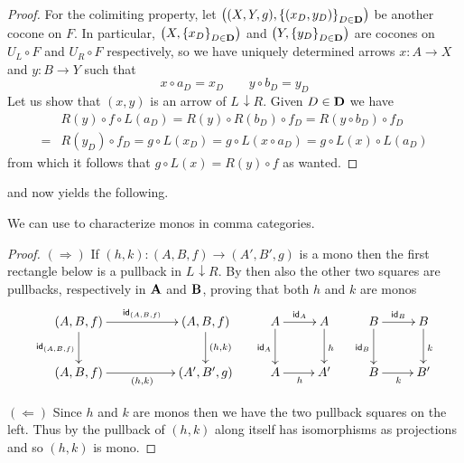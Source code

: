 \documentclass[a4paper,UKenglish,cleveref,pdftex,amsthm,thm-restate,numberwithinsect]{cas-sc}
\theoremstyle{plain}
\newtheorem{corollary}[theorem]{Corollary}
\theoremstyle{definition}
\def\B{\textbf {\textup{B}}}
\def\D{\textbf {\textup{D}}}
\def\A{\textbf {\textup{A}}}
\newcommand{\comm}[2]{#1\hspace{1pt} {\downarrow}#2}
\newcommand{\id}[1]{\mathsf{id}_{#1}}
\begin{document}
\begin{proof}
	For the colimiting property, let $\left((X, Y, g), \left\{\left(x_D, y_D\right)\right\}_{D\in \D}\right)$ be another cocone on $F$. In particular, $\left(X, \left\{x_D\right\}_{D\in \D}\right)$ and $\left(Y, \left\{y_D\right\}_{D\in \D}\right)$ are cocones on $U_L\circ F$ and $U_R\circ F$ respectively, so we have uniquely determined arrows $x\colon A\rightarrow X$ and $y\colon B\rightarrow Y$ such that 
	\[x\circ a_D= x_D \qquad y\circ b_D= y_D\]
	Let us show that $(x,y)$ is an arrow of $\comm{L}{R}$. Given $D\in \D$ we have
	\begin{align*}
		&R(y)\circ f\circ L(a_D)=R(y)\circ R\left(b_D\right)\circ f_D=R\left(y\circ b_D\right)\circ f_D\\=&R\left(y_D\right)\circ f_D= g\circ L\left(x_D\right)=g\circ L\left(x\circ a_D\right)=g\circ L(x)\circ L\left(a_D\right)
	\end{align*}
	from which it follows  that $g\circ L(x)=R(y)\circ f$ as wanted.
\end{proof} 


 and  now yields the following.

We can use  to characterize monos in comma categories. 
\begin{proof}
	$(\Rightarrow)$  If $(h,k)\colon (A,B,f)\to (A', B', g)$ is a mono then the first rectangle below is a pullback in $\comm{L}{R}$. By  then also the other two squares are pullbacks, respectively in $\A$ and $\B$, proving that both $h$ and $k$ are monos
	\[\xymatrix{(A, B, f)  \ar[rr]^{\id{(A,B,f)}} \ar[d]_{\id{(A,B,f)}}&& (A, B, f)  \ar[d]^{(h,k)}& A \ar[r]^{\id{A}} \ar[d]_{\id{A}} & A \ar[d]^{h} & B \ar[r]^{\id{B}} \ar[d]_{\id{B}} & B  \ar[d]^{k}\\ (A, B, f)  \ar[rr]_{(h,k)}&& (A', B', g) &A \ar[r]_{h} & A' & B \ar[r]_{k} & B'}\]
	
\newpage
	\smallskip\noindent 
	\parbox{4cm}{ \xymatrix{A \ar[r]^{\id{A}} \ar[d]_{\id{A}} & A \ar[d]^{h} & B \ar[r]^{\id{B}} \ar[d]_{\id{B}} & B  \ar[d]^{k}\\ A \ar[r]_{h} & A' & B \ar[r]_{k} & B'}}\hfill \parbox{8.5cm}{$(\Leftarrow)$ Since $h$ and $k$ are monos then we have the two pullback squares on the left. Thus by  the pullback of $(h,k)$ along itself has isomorphisms as projections and so $(h,k)$ is mono. \qedhere}
	
\end{proof}
\end{document}

